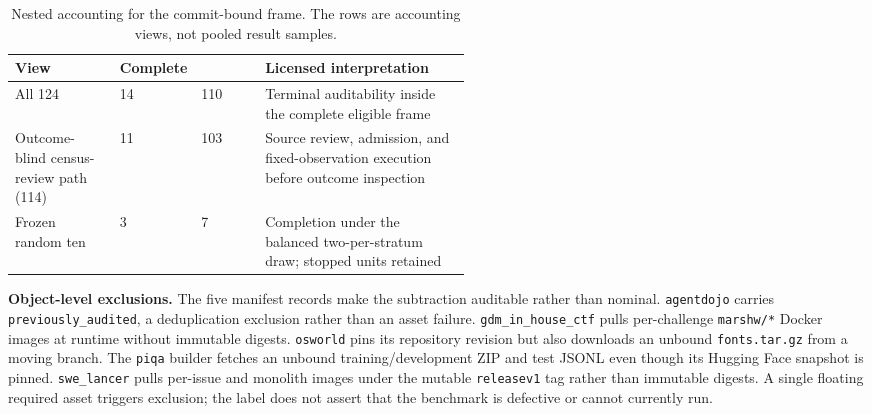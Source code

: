 \begin{table}[ht]
\centering
\caption{Nested accounting for the commit-bound frame.  The rows are accounting views, not pooled result samples.}
\label{tab:reviewer-frame-accounting}
\begin{tabularx}{\linewidth}{@{}p{0.23\linewidth}p{0.16\linewidth}p{0.14\linewidth}Y@{}}
\toprule View & Complete & \STOP{} & Licensed interpretation \\
\midrule
All 124 & 14 & 110 & Terminal auditability inside the complete eligible frame \\
Outcome-blind census-review path (114) & 11 & 103 & Source review, admission, and fixed-observation execution before outcome inspection \\
Frozen random ten & 3 & 7 & Completion under the balanced two-per-stratum draw; stopped units retained \\
\bottomrule
\end{tabularx}
\end{table}

\begin{minipage}{\linewidth}
\noindent\textbf{Object-level exclusions.}  The five manifest records make the subtraction auditable rather than nominal.  \texttt{agentdojo} carries \texttt{previously\_audited}, a deduplication exclusion rather than an asset failure.  \texttt{gdm\_in\_house\_ctf} pulls per-challenge \texttt{marshw/*} Docker images at runtime without immutable digests.  \texttt{osworld} pins its repository revision but also downloads an unbound \texttt{fonts.tar.gz} from a moving branch.  The \texttt{piqa} builder fetches an unbound training/development ZIP and test JSONL even though its Hugging Face snapshot is pinned.  \texttt{swe\_lancer} pulls per-issue and monolith images under the mutable \texttt{releasev1} tag rather than immutable digests.  A single floating required asset triggers exclusion; the label does not assert that the benchmark is defective or cannot currently run.
\end{minipage}

